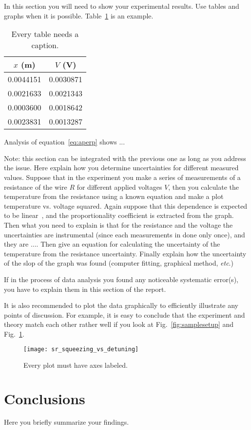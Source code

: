 \documentclass[letterpaper,12pt]{article}
\begin{document}
In this section you will need to show your experimental results. Use tables and
graphs when it is possible. Table~\ref{tbl:bins} is an example.

\begin{table}[ht]
\begin{center}
\caption{Every table needs a caption.}
\label{tbl:bins} %
\begin{tabular}{|cc|}
\hline
\multicolumn{1}{|c}{$x$ (m)} & \multicolumn{1}{c|}{$V$ (V)} \\
\hline
0.0044151 &   0.0030871 \\
0.0021633 &   0.0021343 \\
0.0003600 &   0.0018642 \\
0.0023831 &   0.0013287 \\
\hline
\end{tabular}
\end{center}
\end{table}

Analysis of equation~\ref{eq:aperp} shows ...

Note: this section can be integrated with the previous one as long as you
address the issue. Here explain how you determine uncertainties for different
measured values. Suppose that in the experiment you make a series of
measurements of a resistance of the wire $R$ for different applied voltages
$V$, then you calculate the temperature from the resistance using a known
equation and make a plot  temperature vs. voltage squared. Again suppose that
this dependence is expected to be linear~\cite{Cyr}, and the proportionality coefficient
is extracted from the graph. Then what you need to explain is that for the
resistance and the voltage the uncertainties are instrumental (since each
measurements in done only once), and they are $\dots$. Then give an equation
for calculating the uncertainty of the temperature from the resistance
uncertainty. Finally explain how the uncertainty of the slop of the graph was
found (computer fitting, graphical method, \emph{etc}.)

If in the process of data analysis you found any noticeable systematic
error(s), you have to explain them in this section of the report.

It is also recommended to plot the data graphically to efficiently illustrate
any points of discussion. For example, it is easy to conclude that the
experiment and theory match each other rather well if you look at
Fig.~\ref{fig:samplesetup} and Fig.~\ref{fig:exp_plots}.

\begin{figure}[ht]
  \centering
      \texttt{[image: sr\_squeezing\_vs\_detuning]}

        \caption{
                \label{fig:exp_plots}
                Every plot must have axes labeled.
        }
\end{figure}


\section{Conclusions}
Here you briefly summarize your findings.
\end{document}
